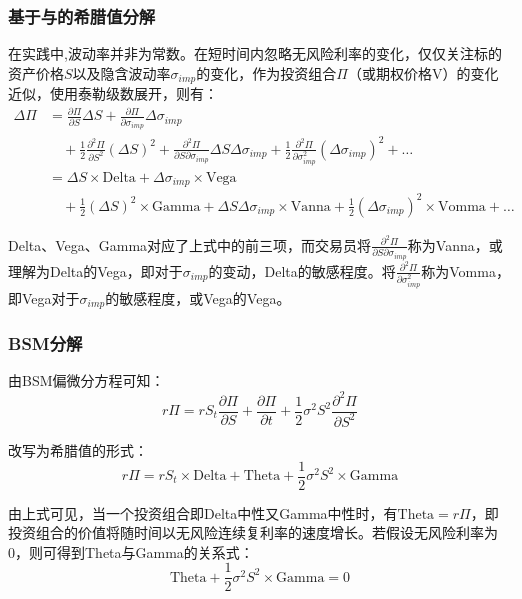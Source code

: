 \documentclass[11pt]{article}
\begin{document}
\subsubsection{基于与\tops{$\sigma$}的希腊值分解}

在实践中,波动率并非为常数。在短时间内忽略无风险利率的变化，仅仅关注标的资产价格$S$以及隐含波动率$\sigma_{imp}$的变化，作为投资组合$\Pi$（或期权价格V）的变化近似，使用泰勒级数展开，则有：
\begin{align*}
    \Delta \Pi &= \frac{\partial \Pi}{\partial S}\Delta S + \frac{\partial \Pi}{\partial \sigma_{imp}}\Delta \sigma_{imp} \\
    &\quad + \frac{1}{2} \frac{\partial^2 \Pi}{\partial S^2}(\Delta S)^2 + \frac{\partial^2 \Pi}{\partial S \partial \sigma_{imp}}\Delta S \Delta \sigma_{imp} + \frac{1}{2} \frac{\partial^2 \Pi}{\partial \sigma^2_{imp}} (\Delta \sigma_{imp})^2 + \dots \\
    &= \Delta S \times \text{Delta} + \Delta \sigma_{imp} \times \text{Vega} \\
    &\quad + \frac{1}{2} (\Delta S)^2 \times \text{Gamma} + \Delta S \Delta \sigma_{imp} \times \text{Vanna} + \frac{1}{2} (\Delta \sigma_{imp})^2 \times \text{Vomma} + \dots
\end{align*}

Delta、Vega、Gamma对应了上式中的前三项，而交易员将$\tfrac{\partial^2 \Pi}{\partial S\partial \sigma_{imp}}$称为Vanna，或理解为Delta的Vega，即对于$\sigma_{imp}$的变动，Delta的敏感程度。将$\tfrac{\partial^2 \Pi}{\partial \sigma^2_{imp}}$称为Vomma，即Vega对于$\sigma_{imp}$的敏感程度，或Vega的Vega。

\subsubsection{BSM分解}

由BSM偏微分方程可知：
\begin{equation*}
    r \Pi = r S_t \frac{\partial \Pi}{\partial S} + \frac{\partial \Pi}{\partial t} + \frac{1}{2} \sigma^2 S^2 \frac{\partial^2 \Pi}{\partial S^2}
\end{equation*}

改写为希腊值的形式：
\begin{equation*}
    \boxed{
        r \Pi = r S_t \times \text{Delta} + \text{Theta} + \frac{1}{2} \sigma^2 S^2 \times \text{Gamma}
    }
\end{equation*}

由上式可见，当一个投资组合即Delta中性又Gamma中性时，有$\text{Theta} = r\Pi$，即投资组合的价值将随时间以无风险连续复利率的速度增长。若假设无风险利率为0，则可得到Theta与Gamma的关系式：
\begin{equation*}
    \text{Theta} + \frac{1}{2} \sigma^2 S^2 \times \text{Gamma} = 0
\end{equation*}
\end{document}
